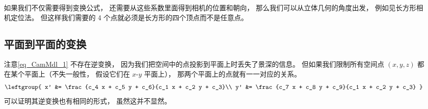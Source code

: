 如果我们不仅需要得到变换公式， 还需要从这些系数里面得到相机的位置和朝向， 那么我们可以从立体几何的角度出发， 例如见长方形相机定位法。 但这样我们需要的 4 个点就必须是长方形的四个顶点而不是任意点。

\subsection{平面到平面的变换}
注意\autoref{eq_CamMdl_1} 不存在逆变换， 因为我们把空间中的点投影到平面上时丢失了景深的信息。 但如果我们限制所有空间点 $(x, y, z)$ 都在某个平面上（不失一般性， 假设它们在 $x$-$y$ 平面上）， 那两个平面上的点就有一一对应的关系。
\begin{equation}
\leftgroup{
x' &= \frac{c_4 x + c_5 y + c_6}{c_1 x + c_2 y + c_3}\\
y' &= \frac{c_7 x + c_8 y + c_9}{c_1 x + c_2 y + c_3}
}~
\end{equation}
可以证明其逆变换也有相同的形式， 虽然这并不显然。
